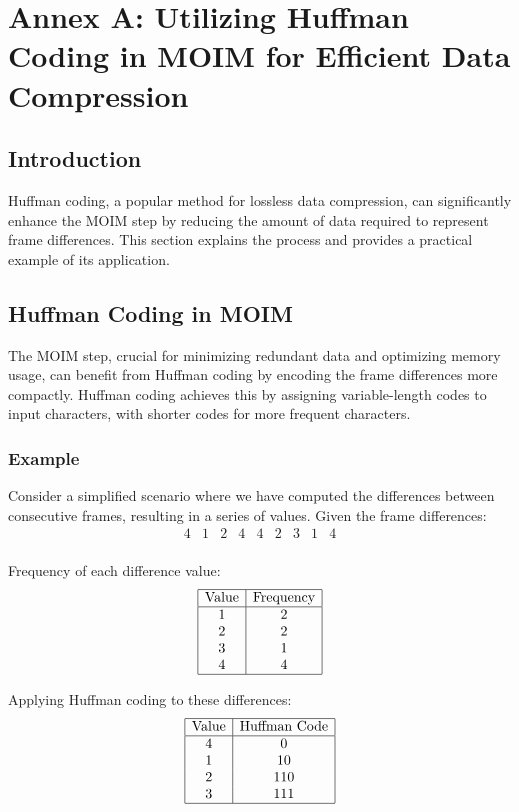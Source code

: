 \documentclass[twocolumn]{article}
\begin{document}
\clearpage
\newpage
\appendix
\section{Annex A: Utilizing Huffman Coding in MOIM for Efficient Data Compression}
\label{appendix:a}
\subsection{Introduction}
Huffman coding, a popular method for lossless data compression, can significantly enhance the MOIM step by reducing the amount of data required to represent frame differences. This section explains the process and provides a practical example of its application.

\subsection{Huffman Coding in MOIM}
The MOIM step, crucial for minimizing redundant data and optimizing memory usage, can benefit from Huffman coding by encoding the frame differences more compactly. Huffman coding achieves this by assigning variable-length codes to input characters, with shorter codes for more frequent characters. 

\subsubsection{Example}
Consider a simplified scenario where we have computed the differences between consecutive frames, resulting in a series of values. Given the frame differences:
\[
\begin{array}{ccccccccc}
4 & 1 & 2 & 4 & 4 & 2 & 3 & 1 & 4 \\
\end{array}
\]

Frequency of each difference value:
\[
\begin{array}{|c|c|}
\hline
\text{Value} & \text{Frequency} \\
\hline
1 & 2 \\
2 & 2 \\
3 & 1 \\
4 & 4 \\
\hline
\end{array}
\]

Applying Huffman coding to these differences:
\[
\begin{array}{|c|c|}
\hline
\text{Value} & \text{Huffman Code} \\
\hline
4 & 0 \\
1 & 10 \\
2 & 110 \\
3 & 111 \\
\hline
\end{array}
\]
\end{document}
